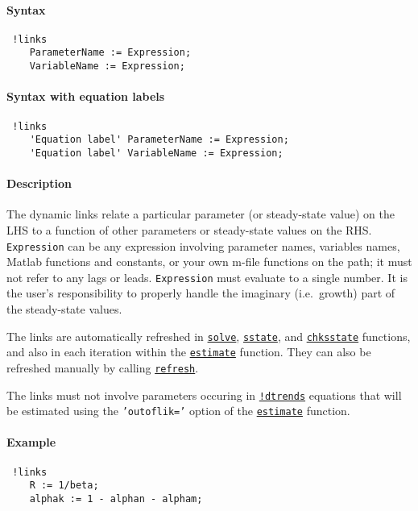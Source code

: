 


	\paragraph{Syntax}
 
 \begin{verbatim}
 !links
    ParameterName := Expression;
    VariableName := Expression;
 \end{verbatim}
 
 \paragraph{Syntax with equation labels}
 
 \begin{verbatim}
 !links
    'Equation label' ParameterName := Expression;
    'Equation label' VariableName := Expression;
 \end{verbatim}
 
 \paragraph{Description}
 
 The dynamic links relate a particular parameter (or steady-state value)
 on the LHS to a function of other parameters or steady-state values on
 the RHS. \texttt{Expression} can be any expression involving parameter
 names, variables names, Matlab functions and constants, or your own
 m-file functions on the path; it must not refer to any lags or leads.
 \texttt{Expression} must evaluate to a single number. It is the user's
 responsibility to properly handle the imaginary (i.e.~growth) part of
 the steady-state values.
 
 The links are automatically refreshed in
 \href{model/solve}{\texttt{solve}},
 \href{model/sstate}{\texttt{sstate}}, and
 \href{model/chksstate}{\texttt{chksstate}} functions, and also in each
 iteration within the \href{model/estimate}{\texttt{estimate}} function.
 They can also be refreshed manually by calling
 \href{model/refresh}{\texttt{refresh}}.
 
 The links must not involve parameters occuring in
 \href{modellang/dtrends}{\texttt{!dtrends}} equations that will be
 estimated using the \texttt{'outoflik='} option of the
 \href{model/estimate}{\texttt{estimate}} function.
 
 \paragraph{Example}
 
 \begin{verbatim}
 !links
    R := 1/beta;
    alphak := 1 - alphan - alpham;
 \end{verbatim}


